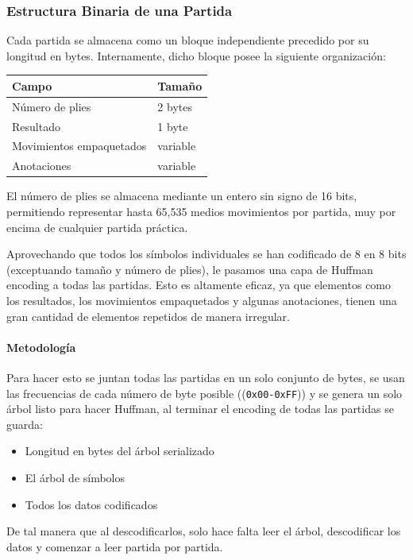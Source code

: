 \documentclass[11pt, letterpaper]{article}
\begin{document}
\subsubsection{Estructura Binaria de una Partida}

Cada partida se almacena como un bloque independiente precedido por su longitud en bytes. Internamente, dicho bloque posee la siguiente organización:

\begin{center}
\begin{tabular}{ll}
\hline
Campo & Tamaño \\
\hline
Número de plies & 2 bytes \\
Resultado & 1 byte \\
Movimientos empaquetados & variable \\
Anotaciones & variable \\
\hline
\end{tabular}
\end{center}

El número de plies se almacena mediante un entero sin signo de 16 bits, permitiendo representar hasta 65,535 medios movimientos por partida, muy por encima de cualquier partida práctica.

Aprovechando que todos los símbolos individuales se han codificado de 8 en 8 bits (exceptuando tamaño y número de plies), le pasamos una capa de Huffman encoding a todas las partidas.
Esto es altamente eficaz, ya que elementos como los resultados, los movimientos empaquetados y algunas anotaciones, tienen una gran cantidad de elementos repetidos de manera irregular.

\paragraph{Metodología}
Para hacer esto se juntan todas las partidas en un solo conjunto de bytes, se usan las frecuencias de cada número de byte posible ((\texttt{0x00-0xFF})) y se genera un solo árbol listo para hacer Huffman, al terminar el encoding de todas las partidas se guarda:

\begin{itemize}
\item Longitud en bytes del árbol serializado
\item El árbol de símbolos
\item Todos los datos codificados
\end{itemize}

De tal manera que al descodificarlos, solo hace falta leer el árbol, descodificar los datos y comenzar a leer partida por partida.
\end{document}
